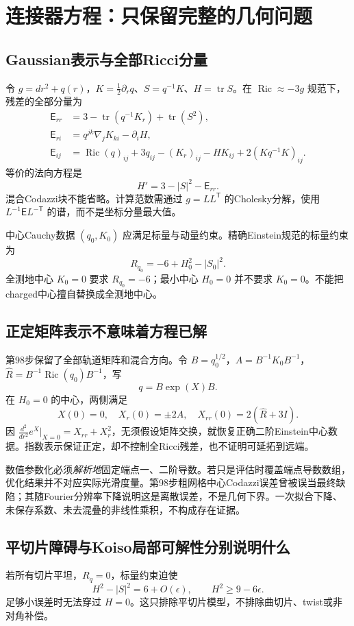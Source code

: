 \documentclass[UTF8,a4paper,11pt,fontset=fandol]{ctexart}
\numberwithin{equation}{section}
\theoremstyle{definition}
\newcommand{\Ric}{\operatorname{Ric}}
\newcommand{\tr}{\operatorname{tr}}
\begin{document}
\section{连接器方程：只保留完整的几何问题}
\subsection{Gaussian表示与全部Ricci分量}
令 $g=dr^2+q(r)$，$K=\frac12\partial_rq$、$S=q^{-1}K$、$H=\tr S$。在 $\Ric\approx-3g$ 规范下，残差的全部分量为
\begin{align}
\mathsf E_{rr}&=3-\tr(q^{-1}K_r)+\tr(S^2),\\
\mathsf E_{ri}&=q^{jk}\nabla_jK_{ki}-\partial_iH,\\
\mathsf E_{ij}&=\Ric(q)_{ij}+3q_{ij}-(K_r)_{ij}-HK_{ij}
+2(Kq^{-1}K)_{ij}.\label{eq:fullRic}
\end{align}
等价的法向方程是
\[
H'=3-|S|^2-\mathsf E_{rr}.
\]
混合Codazzi块不能省略。计算范数需通过 $g=LL^{\mathsf T}$ 的Cholesky分解，使用 $L^{-1}\mathsf E L^{-\mathsf T}$ 的谱，而不是坐标分量最大值。

中心Cauchy数据 $(q_0,K_0)$ 应满足标量与动量约束。精确Einstein规范的标量约束为
\[
R_{q_0}=-6+H_0^2-|S_0|^2.
\]
全测地中心 $K_0=0$ 要求 $R_{q_0}=-6$；最小中心 $H_0=0$ 并不要求 $K_0=0$。不能把charged中心擅自替换成全测地中心。

\subsection{正定矩阵表示不意味着方程已解}
第98步保留了全部轨道矩阵和混合方向。令 $B=q_0^{1/2}$，$A=B^{-1}K_0B^{-1}$，$\widehat R=B^{-1}\Ric(q_0)B^{-1}$，写
\[
q=B\exp(X)B.
\]
在 $H_0=0$ 的中心，两侧满足
\[
X(0)=0,\quad X_r(0)=\pm2A,\quad X_{rr}(0)=2(\widehat R+3I).
\]
因 $\frac{d^2}{dr^2}e^X|_{X=0}=X_{rr}+X_r^2$，无须假设矩阵交换，就恢复正确二阶Einstein中心数据。指数表示保证正定，却不控制全Ricci残差，也不证明可延拓到远端。

数值参数化必须\emph{解析地}固定端点一、二阶导数。若只是评估时覆盖端点导数数组，优化结果并不对应实际光滑度量。第98步粗网格中心Codazzi误差曾被误当最终缺陷；其随Fourier分辨率下降说明这是离散误差，不是几何下界。一次拟合下降、未保存系数、未去混叠的非线性乘积，不构成存在证据。

\subsection{平切片障碍与Koiso局部可解性分别说明什么}
若所有切片平坦，$R_q=0$，标量约束迫使
\[
H^2-|S|^2=6+O(\epsilon),\qquad
H^2\ge9-6\epsilon.
\]
足够小误差时无法穿过 $H=0$。这只排除平切片模型，不排除曲切片、twist或非对角补偿。
\end{document}
